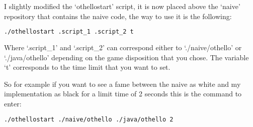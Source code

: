 I slightly modified the `othellostart' script, it is now placed above the `naive' repository that contains the naive code, the way to use it is the following:

\begin{lstlisting}[language=bash]
./othellostart .script_1 .script_2 t
\end{lstlisting}

Where `.script\_1' and `.script\_2' can correspond either to `./naive/othello' or `./java/othello' depending on the game disposition that you chose.
The variable `t' corresponds to the time limit that you want to set.

So for example if you want to see a fame between the naive as white and my implementation as black for a limit time of 2 seconds this is the command to enter:

\begin{lstlisting}[language=bash]
./othellostart ./naive/othello ./java/othello 2
\end{lstlisting}
